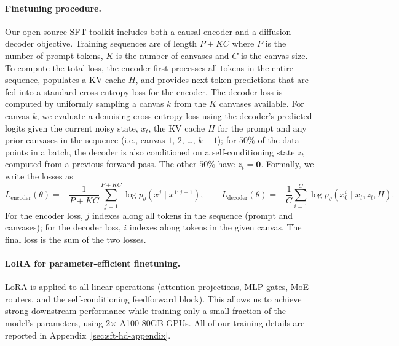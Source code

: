 \documentclass[11pt, a4paper, logo, copyright, gdm]{google}
\begin{document}
\paragraph{Finetuning procedure.} Our open-source SFT toolkit includes both a causal encoder and a diffusion decoder objective. Training sequences are of length $P+KC$ where $P$ is the number of prompt tokens, $K$ is the number of canvases and $C$ is the canvas size. To compute the total loss, the encoder first processes all tokens in the entire sequence, populates a KV cache $H$, and provides next token predictions that are fed into a standard cross-entropy loss for the encoder. The decoder loss is computed by uniformly sampling a canvas $k$ from the $K$ canvases available. For canvas $k$, we evaluate a denoising cross-entropy loss using the decoder's predicted logits given the current noisy state, $x_t$, the KV cache $H$ for the prompt and any prior canvases in the sequence (i.e., canvas $1$, $2$, \ldots, $k-1$); for $50\%$ of the data-points in a batch, the decoder is also conditioned on a self-conditioning state $z_t$ computed from a previous forward pass. The other $50\%$ have $z_t = \textbf{0}$.
 Formally, we write the losses as
\begin{equation}
   L_{\text{encoder}}(\theta) = - \frac{1}{P+KC} \sum_{j=1}^{P+KC} \log p_\theta(x^j \mid x^{1:j-1}) , \quad  \quad L_{\text{decoder}}(\theta) = - \frac{1}{C} \sum_{i=1}^C \log p_\theta(x_0^{i} \mid x_t, z_t, H).
\end{equation}
For the encoder loss, $j$ indexes along all tokens in the sequence (prompt and canvases); for the decoder loss, $i$ indexes along tokens in the given canvas. The final loss is the sum of the two losses.

\paragraph{LoRA for parameter-efficient finetuning.} LoRA is applied to all linear operations (attention projections, MLP gates, MoE routers, and the self-conditioning feedforward block). This allows us to achieve strong downstream performance while training only a small fraction of the model's parameters, using 2$\times$ A100 80GB GPUs. All of our training details are reported in Appendix~\ref{sec:sft-hd-appendix}.
\end{document}
